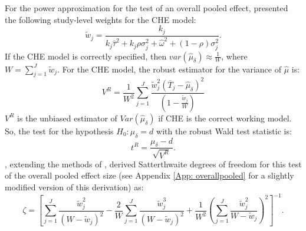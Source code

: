 For the power approximation for the test of an overall pooled effect, \textcite{vembye2023} presented the following study-level weights for the CHE model:
\begin{equation} \label{eq: CHEweights-study}
    \tilde{w}_j = \frac{k_j}{k_j\hat{\tau}^2 + k_j\rho\sigma_j^2 +\hat{\omega}^2 + (1- \rho)\sigma_j^2}.
\end{equation}
If the CHE model is correctly specified, then $var(\hat{\mu}_{\delta}) \approx \frac{1}{W}$,
 where $W = \sum_{j=1}^J \tilde{w}_j$. For the CHE model, the robust estimator for the variance of $\hat{\mu}$ is:
\begin{equation}
    V^R = \frac{1}{W^2}\sum_{j=1}^J\frac{\tilde{w}_j^2(\overline{T}_j -\hat{\mu}_{\delta})^2}{(1-\frac{\tilde{w}_j}{W})}
\end{equation}
$V^R$ is the unbiased estimator of $Var(\hat{\mu}_{\delta})$ if CHE is the correct working model. So, the test for the hypothesis $H_0: \mu_{\delta} = d$ with the robust Wald test statistic is:
\begin{equation}
    t^R = \frac{\mu_{\delta} - d}{\sqrt{V^R}}.
\end{equation}
\textcite{vembye2023}, extending the methods of \textcite{tipton2015a}, derived Satterthwaite degrees of freedom for this test of the overall pooled effect size (see Appendix \ref{App: overallpooled} for a slightly modified version of this derivation) as:
\begin{equation} \label{eq: satt df overall pooled}
    \zeta = \left[ \sum_{j=1}^J \frac{\tilde{w}_j^2}{(W-\tilde{w}_j)^2} - \frac{2}{W} \sum_{j=1}^J \frac{\tilde{w}_j^3}{(W-\tilde{w}_j)^2} + \frac{1}{W^2} \left(\sum_{j=1}^J \frac{\tilde{w}_j^2}{W-\tilde{w}_j}   \right)^2\right]^{-1}.
\end{equation}


